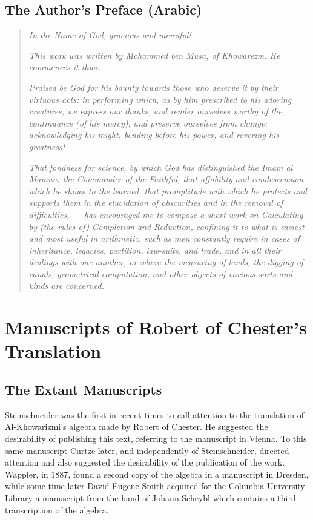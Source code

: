 \documentclass[11pt,a4paper,twoside]{book}
\begin{document}
\section*{The Author's Preface (Arabic)}

\begin{quote}
\textit{In the Name of God, gracious and merciful!}

\textit{This work was written by Mohammed ben Musa, of Khowarezm. He commences it thus:}

\textit{Praised be God for his bounty towards those who deserve it by their virtuous acts: in performing which, as by him prescribed to his adoring creatures, we express our thanks, and render ourselves worthy of the continuance (of his mercy), and preserve ourselves from change: acknowledging his might, bending before his power, and revering his greatness!}

\textit{That fondness for science, by which God has distinguished the Imam al Mamun, the Commander of the Faithful, that affability and condescension which he shows to the learned, that promptitude with which he protects and supports them in the elucidation of obscurities and in the removal of difficulties, --- has encouraged me to compose a short work on Calculating by (the rules of) Completion and Reduction, confining it to what is easiest and most useful in arithmetic, such as men constantly require in cases of inheritance, legacies, partition, law-suits, and trade, and in all their dealings with one another, or where the measuring of lands, the digging of canals, geometrical computation, and other objects of various sorts and kinds are concerned.}
\end{quote}

\chapter{Manuscripts of Robert of Chester's Translation}

\section{The Extant Manuscripts}

Steinschneider was the first in recent times to call attention to the translation of Al-Khowarizmi's algebra made by Robert of Chester. He suggested the desirability of publishing this text, referring to the manuscript in Vienna. To this same manuscript Curtze later, and independently of Steinschneider, directed attention and also suggested the desirability of the publication of the work. Wappler, in 1887, found a second copy of the algebra in a manuscript in Dresden, while some time later David Eugene Smith acquired for the Columbia University Library a manuscript from the hand of Johann Scheybl which contains a third transcription of the algebra.
\end{document}
